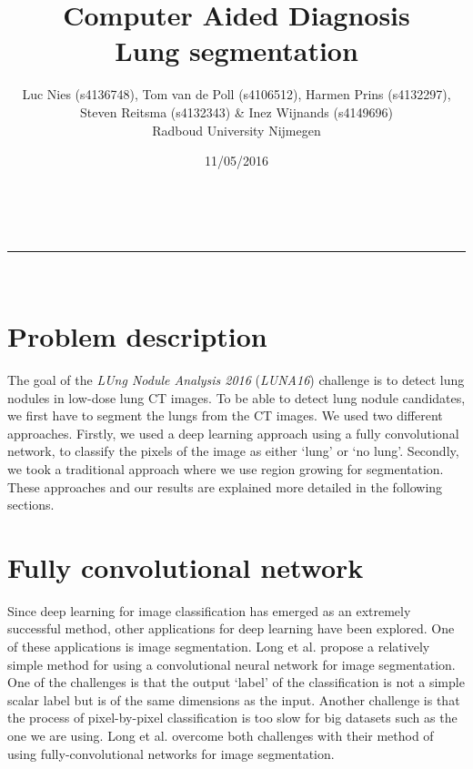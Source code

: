 \documentclass[a4paper,10pt]{article}
\makeatletter
\numberwithin{equation}{section} %
\numberwithin{figure}{section} %
\numberwithin{table}{section} %
\newcommand{\linia}{\rule{\linewidth}{0.5pt}}
\renewcommand{\maketitle}{
\begin{center}
\vspace{2ex}
{\huge \textsc{\@title}}
\vspace{1ex}
\\
\linia\\
\@author  \@date
\vspace{4ex}
\end{center}
}
\makeatother
\begin{document}
\title{Computer Aided Diagnosis \\\vspace{0.2cm} Lung segmentation}

\author{Luc Nies (s4136748), Tom van de Poll (s4106512), Harmen Prins (s4132297),\\ Steven Reitsma (s4132343) \& Inez Wijnands (s4149696)\\ Radboud University Nijmegen\\}

\date{11/05/2016}

\maketitle

\section{Problem description}
The goal of the \textit{LUng Nodule Analysis 2016} (\textit{LUNA16}) challenge is to detect lung nodules in low-dose lung CT images. To be able to detect lung nodule candidates, we first have to segment the lungs from the CT images. We used two different approaches. Firstly, we used a deep learning approach using a fully convolutional network, to classify the pixels of the image as either `lung' or `no lung'. Secondly, we took a traditional approach where we use region growing for segmentation. These approaches and our results are explained more detailed in the following sections.

\section{Fully convolutional network}

Since deep learning for image classification has emerged as an extremely successful method, other applications for deep learning have been explored.
One of these applications is image segmentation.
Long et al. \cite{long2015fully} propose a relatively simple method for using a convolutional neural network for image segmentation.
One of the challenges is that the output `label' of the classification is not a simple scalar label but is of the same dimensions as the input.
Another challenge is that the process of pixel-by-pixel classification is too slow for big datasets such as the one we are using.
Long et al. \cite{long2015fully} overcome both challenges with their method of using fully-convolutional networks for image segmentation.
\end{document}

